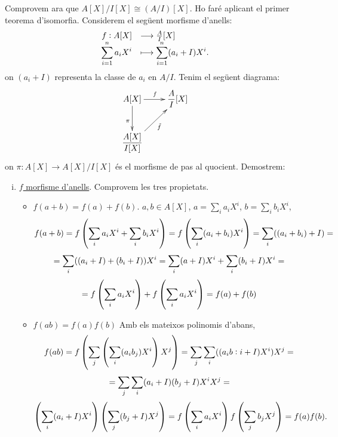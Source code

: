 \documentclass[../main.tex]{subfiles}
\begin{document}
\begin{sol}
\begin{enumerate}[(a)]
    Comprovem ara que $A[X]/I[X]\cong (A/I)[X]$. Ho faré aplicant el primer teorema d'isomorfia. Considerem el següent morfisme d'anells:
    \begin{equation}
        \notag
        \begin{array}{rl}
            f:A[X] & \longrightarrow \frac{A}{I}[X] \\
            \displaystyle\sum_{i=1}^n a_iX^{i} & \longmapsto \displaystyle\sum_{i=1}^n(a_i+I)X^{i}.
        \end{array}
    \end{equation}
    on $(a_i+I)$ representa la classe de $a_i$ en $A/I$. Tenim el següent diagrama:
    \begin{equation}
        \notag
        \xymatrix{
        A[X] \ar[d]_{\pi} \ar[r]^f & \dfrac{A}{I}[X] \\
        \dfrac{A[X]}{I[X]} \ar[ru]_{\Tilde{f}}
        }
    \end{equation}
    on $\pi:A[X]\rightarrow A[X]/I[X]$ és el morfisme de pas al quocient. Demostrem:
    \begin{enumerate}[(i)]
        \item \underline{$f$ morfisme d'anells}. Comprovem les tres propietats.
        \begin{itemize}
            \item \underline{$f(a+b) = f(a)+f(b)$}. $a,b\in A[X]$, $a=\sum_i a_iX^{i}$, $b=\sum_ib_iX^{i}$,
            \begin{equation}
                \notag
                f(a+b) = f\left(\sum_i a_iX^{i}+\sum_ib_iX^{i}\right) = f\left(\sum_i(a_i+b_i)X^{i}\right) = \sum_i((a_i+b_i)+I) =
            \end{equation}
            \begin{equation}
                \notag
                = \sum_i((a_i+I)+(b_i+I))X^{i} = \sum_i(a+I)X^{i}+\sum_i(b_i+I)X^{i} = 
            \end{equation}
            \begin{equation}
                \notag
                =f\left(\sum_ia_iX^{i}\right)+f\left(\sum_ia_iX^{i}\right) = f(a)+f(b)
            \end{equation}
            
            \item \underline{$f(ab) = f(a)f(b)$} Amb els mateixos polinomis d'abans,
            \begin{equation}
                \notag
                f(ab) = f\left(\sum_j\left(\sum_i(a_ib_j)X^{i}\right)X^j\right) = \sum_j\sum_i((a_ib:i+I)X^{i})X^j = 
            \end{equation}
            \begin{equation}
                \notag
                = \sum_j\sum_i(a_i+I)(b_j+I)X^{i}X^j =
            \end{equation}
            \begin{equation}
                \notag
                \left(\sum_i(a_i+I)X^{i}\right)\left(\sum_j(b_j+I)X^j\right) = f\left(\sum_ia_iX^{i}\right)f\left(\sum_jb_jX^j\right) = f(a)f(b).
            \end{equation}
            

\end{itemize}
\end{enumerate}
\end{enumerate}
\end{sol}
\end{document}
